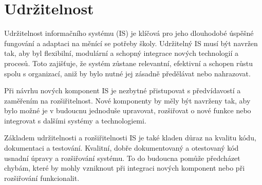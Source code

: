 \chapter{Udržitelnost}
Udržitelnost informačního systému (IS) je klíčová pro jeho dlouhodobé úspěšné fungování a adaptaci na měnící se potřeby školy. Udržitelný IS musí být navržen tak, aby byl flexibilní, modulární a schopný integrace nových technologií a procesů. Toto zajišťuje, že systém zůstane relevantní, efektivní a schopen růstu spolu s organizací, aniž by bylo nutné jej zásadně předělávat nebo nahrazovat.

Při návrhu nových komponent IS je nezbytné přistupovat s předvídavostí a zaměřením na rozšiřitelnost. Nové komponenty by měly být navrženy tak, aby bylo možné je v budoucnu jednoduše upravovat, rozšiřovat o nové funkce nebo integrovat s dalšími systémy a technologiemi.

Základem udržitelnosti a rozšiřitelnosti IS je také kladen důraz na kvalitu kódu, dokumentaci a testování. Kvalitní, dobře dokumentovaný a otestovaný kód usnadní úpravy a rozšiřování systému. To do budoucna pomůže předcházet chybám, které by mohly vzniknout při integraci nových komponent nebo při rozšiřování funkcionalit.